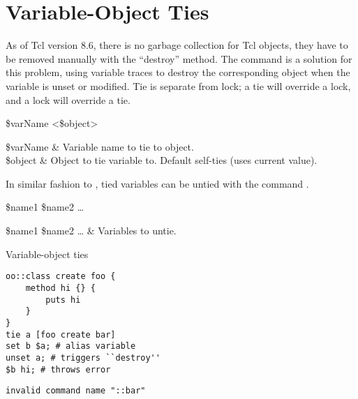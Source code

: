 \documentclass{article}
\begin{document}
\clearpage

\section{Variable-Object Ties}
As of Tcl version 8.6, there is no garbage collection for Tcl objects, they have to be removed manually with the ``destroy'' method. 
The command  is a solution for this problem, using variable traces to destroy the corresponding object when the variable is unset or modified. 
Tie is separate from lock; a tie will override a lock, and a lock will override a tie.
\begin{syntax}
 \$varName <\$object>
\end{syntax}
\begin{args}
\$varName & Variable name to tie to object. \\
\$object & Object to tie variable to. Default self-ties (uses current value).
\end{args}

In similar fashion to , tied variables can be untied with the command .

\begin{syntax}
 \$name1 \$name2 …
\end{syntax}
\begin{args}
\$name1 \$name2 … & Variables to untie.
\end{args}

\begin{example}{Variable-object ties}
\begin{lstlisting}
oo::class create foo {
    method hi {} {
        puts hi
    }
}
tie a [foo create bar]
set b $a; # alias variable
unset a; # triggers ``destroy''
$b hi; # throws error
\end{lstlisting}
\tcblower
\begin{lstlisting}
invalid command name "::bar"
\end{lstlisting}
\end{example}
\clearpage
\end{document}
